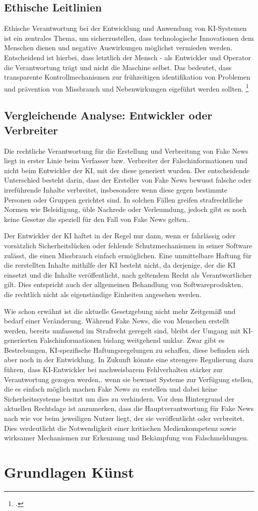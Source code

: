 \documentclass[Thesis.tex]{subfiles}
\begin{document}
\subsection{Ethische Leitlinien}
Ethische Verantwortung bei der Entwicklung und Anwendung von KI-Systemen ist ein zentrales Thema,
um sicherzustellen, dass technologische Innovationen dem Menschen dienen und negative Auswirkungen 
möglichst vermieden werden. Entscheidend ist hierbei, dass letztlich der Mensch - als Entwickler und 
Operator die Verantwortung trägt und nicht die Maschine selbst. Das bedeutet, dass transparente 
Kontrollmechanismen zur frühzeitigen identifikation von Problemen und prävention von Missbrauch 
und Nebenwirkungen eigeführt werden sollten. \footcite{EthikLeitlinien2018}

\subsection{Vergleichende Analyse: Entwickler oder Verbreiter}
Die rechtliche Verantwortung für die Erstellung und Verbreitung von Fake News liegt in erster Linie
beim Verfasser bzw. Verbreiter der Falschinformationen und nicht beim Entwickler der KI, mit der diese
generiert wurden. Der entscheidende Unterschied besteht darin, dass der Ersteller von Fake News bewusst
falsche oder irreführende Inhalte verbreitet, insbesondere wenn diese gegen bestimmte Personen 
oder Gruppen gerichtet sind. In solchen Fällen greifen strafrechtliche Normen wie Beleidigung,
üble Nachrede oder Verleumdung, jedoch gibt es noch keine Gesetze die speziell für den Fall von
Fake News gelten..

Der Entwickler der KI haftet in der Regel nur dann, wenn er fahrlässig oder vorsätzlich Sicherheitslücken
oder fehlende Schutzmechanismen in seiner Software zulässt, die einen Missbrauch einfach ermöglichen.
Eine unmittelbare Haftung für die rerstellten Inhalte mithilfe der KI besteht nicht, da derjenige, der 
die KI einsetzt und die Inhalte veröffentlicht, nach geltendem Recht als Verantwortlicher gilt. Dies entspricht
auch der allgemeinen Behandlung von Softwareprodukten, die rechtlich nicht als eigenständige Einheiten angesehen werden.

Wie schon erwähnt ist die aktuelle Gesetzgebung nicht mehr Zeitgemäß und bedarf einer Veränderung. Während
Fake News, die von Menschen erstellt werden, bereits umfassend im Strafrecht geregelt sind, bleibt der Umgang
mit KI-generierten Falschinformationen bislang weitgehend unklar. Zwar gibt es Bestrebungen, KI-spezifische
Haftungsregelungen zu schaffen, diese befinden sich aber noch in der Entwicklung. In Zukunft könnte eine 
strengere Regulierung dazu führen, dass KI-Entwickler bei nachweisbarem Fehlverhalten stärker zur 
Verantwortung gezogen werden,. wenn sie bewusst Systeme zur Verfügung stellen, die es einfach möglich
machen Fake News zu erstellen und dabei keine Sicherheitssysteme besitzt um dies zu verhindern.
Vor dem Hintergrund der aktuellen Rechtslage ist anzumerken, dass die Hauptverantwortung für Fake News nach
wie vor beim jeweiligen Nutzer liegt, der sie veröffentlicht oder verbreitet. Dies verdeutlicht die Notwendigkeit 
einer kritischen Medienkompetenz sowie wirksamer Mechanismen zur Erkennung und Bekämpfung von Falschmeldungen.
\section{Grundlagen Künst}
\end{document}
